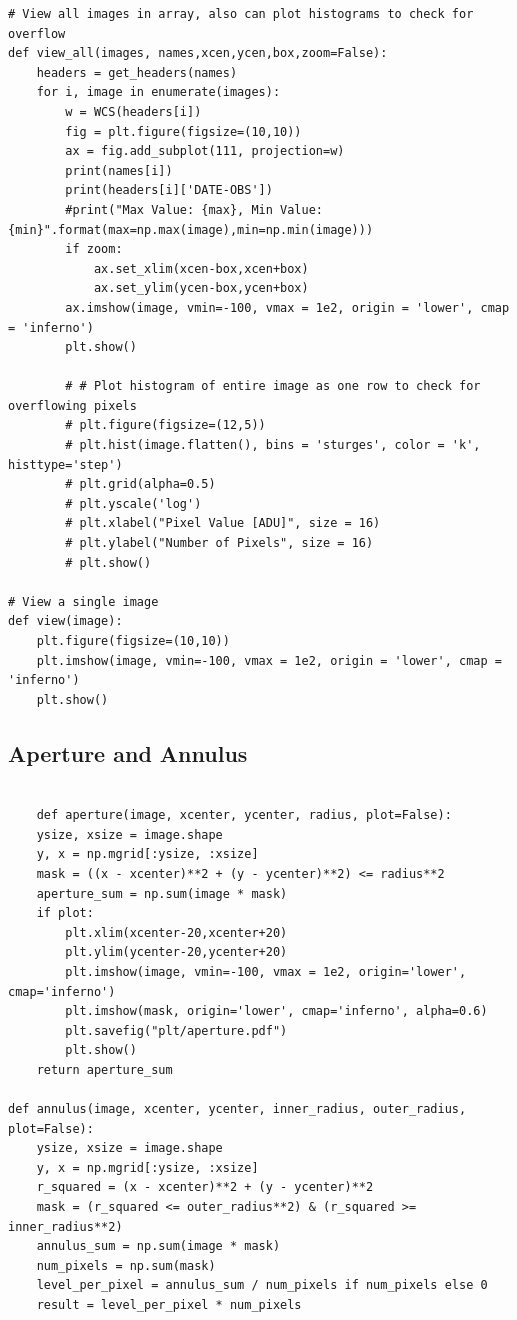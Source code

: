 \documentclass{article}
\begin{document}
\begin{appendices}
\begin{verbatim}
# View all images in array, also can plot histograms to check for overflow
def view_all(images, names,xcen,ycen,box,zoom=False):
    headers = get_headers(names)
    for i, image in enumerate(images):
        w = WCS(headers[i])
        fig = plt.figure(figsize=(10,10))
        ax = fig.add_subplot(111, projection=w)
        print(names[i])
        print(headers[i]['DATE-OBS'])
        #print("Max Value: {max}, Min Value: {min}".format(max=np.max(image),min=np.min(image)))
        if zoom:
            ax.set_xlim(xcen-box,xcen+box)
            ax.set_ylim(ycen-box,ycen+box)
        ax.imshow(image, vmin=-100, vmax = 1e2, origin = 'lower', cmap = 'inferno')
        plt.show()
        
        # # Plot histogram of entire image as one row to check for overflowing pixels
        # plt.figure(figsize=(12,5))
        # plt.hist(image.flatten(), bins = 'sturges', color = 'k', histtype='step')
        # plt.grid(alpha=0.5)
        # plt.yscale('log')
        # plt.xlabel("Pixel Value [ADU]", size = 16)
        # plt.ylabel("Number of Pixels", size = 16)
        # plt.show()
        
# View a single image
def view(image):
    plt.figure(figsize=(10,10))
    plt.imshow(image, vmin=-100, vmax = 1e2, origin = 'lower', cmap = 'inferno')
    plt.show()

\end{verbatim}
\subsection{Aperture and Annulus}
\begin{verbatim}

    def aperture(image, xcenter, ycenter, radius, plot=False):
    ysize, xsize = image.shape
    y, x = np.mgrid[:ysize, :xsize]
    mask = ((x - xcenter)**2 + (y - ycenter)**2) <= radius**2
    aperture_sum = np.sum(image * mask)
    if plot:
        plt.xlim(xcenter-20,xcenter+20)
        plt.ylim(ycenter-20,ycenter+20)
        plt.imshow(image, vmin=-100, vmax = 1e2, origin='lower', cmap='inferno')
        plt.imshow(mask, origin='lower', cmap='inferno', alpha=0.6)
        plt.savefig("plt/aperture.pdf")
        plt.show()
    return aperture_sum

def annulus(image, xcenter, ycenter, inner_radius, outer_radius, plot=False):
    ysize, xsize = image.shape
    y, x = np.mgrid[:ysize, :xsize]
    r_squared = (x - xcenter)**2 + (y - ycenter)**2
    mask = (r_squared <= outer_radius**2) & (r_squared >= inner_radius**2)
    annulus_sum = np.sum(image * mask)
    num_pixels = np.sum(mask)
    level_per_pixel = annulus_sum / num_pixels if num_pixels else 0
    result = level_per_pixel * num_pixels
    

\end{verbatim}
\end{appendices}
\end{document}
